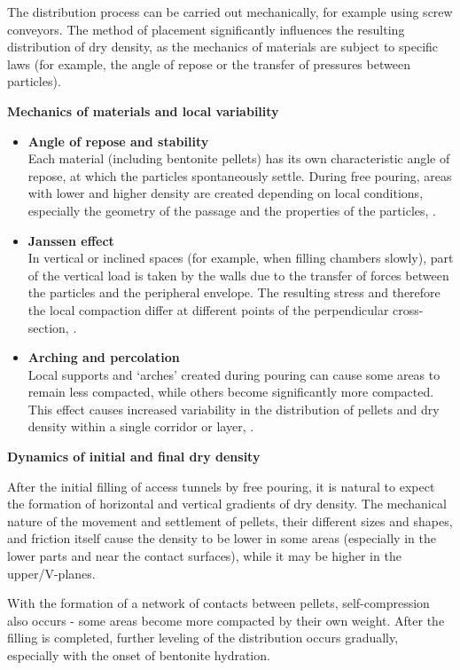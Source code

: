 The distribution process can be carried out mechanically, for example using screw conveyors. The method of placement significantly influences the resulting distribution of dry density, as the mechanics of materials are subject to specific laws (for example, the angle of repose or the transfer of pressures between particles).

\textbf{Mechanics of materials and local variability}

\begin{itemize}
\item \textbf{Angle of repose and stability} \\
Each material (including bentonite pellets) has its own characteristic angle of repose, at which the particles spontaneously settle. During free pouring, areas with lower and higher density are created depending on local conditions, especially the geometry of the passage and the properties of the particles, \cite{SKB:TR-12-06}.
\item \textbf{Janssen effect} \\
In vertical or inclined spaces (for example, when filling chambers slowly), part of the vertical load is taken by the walls due to the transfer of forces between the particles and the peripheral envelope. The resulting stress and therefore the local compaction differ at different points of the perpendicular cross-section, \cite{Janssen:1895}.
\item \textbf{Arching and percolation} \\
Local supports and ‘arches’ created during pouring can cause some areas to remain less compacted, while others become significantly more compacted. This effect causes increased variability in the distribution of pellets and dry density within a single corridor or layer, \cite{Terzaghi:1943}.
\end{itemize}

\textbf{Dynamics of initial and final dry density}

After the initial filling of access tunnels by free pouring, it is natural to expect the formation of horizontal and vertical gradients of dry density. The mechanical nature of the movement and settlement of pellets, their different sizes and shapes, and friction itself cause the density to be lower in some areas (especially in the lower parts and near the contact surfaces), while it may be higher in the upper/V-planes.

With the formation of a network of contacts between pellets, self-compression also occurs - some areas become more compacted by their own weight. After the filling is completed, further leveling of the distribution occurs gradually, especially with the onset of bentonite hydration.

